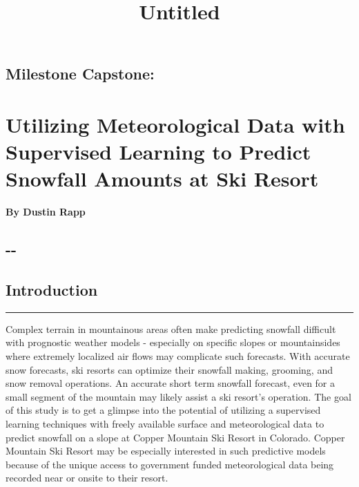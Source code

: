\documentclass[11pt]{article}
\title{Untitled}
\begin{document}
    
    
    \maketitle
    
    

    
    \subsection{Milestone Capstone:}\label{milestone-capstone}

\section{Utilizing Meteorological Data with Supervised Learning to
Predict Snowfall Amounts at Ski
Resort}\label{utilizing-meteorological-data-with-supervised-learning-to-predict-snowfall-amounts-at-ski-resort}

\textbf{By Dustin Rapp}

\subsection{-\/-}\label{section}

\subsection{Introduction}\label{introduction}

\begin{center}\rule{0.5\linewidth}{\linethickness}\end{center}

Complex terrain in mountainous areas often make predicting snowfall
difficult with prognostic weather models - especially on specific slopes
or mountainsides where extremely localized air flows may complicate such
forecasts. With accurate snow forecasts, ski resorts can optimize their
snowfall making, grooming, and snow removal operations. An accurate
short term snowfall forecast, even for a small segment of the mountain
may likely assist a ski resort's operation. The goal of this study is to
get a glimpse into the potential of utilizing a supervised learning
techniques with freely available surface and meteorological data to
predict snowfall on a slope at Copper Mountain Ski Resort in Colorado.
Copper Mountain Ski Resort may be especially interested in such
predictive models because of the unique access to government funded
meteorological data being recorded near or onsite to their resort.
\end{document}
